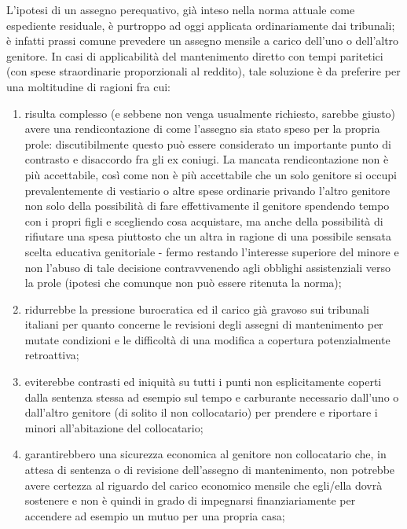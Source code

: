 \documentclass[twocolumn,12pt]{article}
\begin{document}
L'ipotesi di un assegno perequativo, già inteso nella norma attuale come espediente residuale, è purtroppo ad oggi applicata ordinariamente dai tribunali; è infatti prassi comune prevedere un assegno mensile a carico dell'uno o dell'altro genitore. In casi di applicabilità del mantenimento diretto con tempi paritetici (con spese straordinarie proporzionali al reddito), tale soluzione è da preferire per una moltitudine di ragioni fra cui:
\smallbreak
\begin{enumerate}[topsep=0pt,itemsep=-1ex,partopsep=1ex,parsep=1ex]
\item risulta complesso (e sebbene non venga usualmente richiesto, sarebbe giusto) avere una rendicontazione di come l'assegno sia stato speso per la propria prole: discutibilmente questo può essere considerato un importante punto di contrasto e disaccordo fra gli ex coniugi. La mancata rendicontazione non è più accettabile, così come non è più accettabile che un solo genitore si occupi prevalentemente di vestiario o altre spese ordinarie privando l'altro genitore non solo della possibilità di fare effettivamente il genitore spendendo tempo con i propri figli e scegliendo cosa acquistare, ma anche della possibilità di rifiutare una spesa piuttosto che un altra in ragione di una possibile sensata scelta educativa genitoriale - fermo restando l'interesse superiore del minore e non l'abuso di tale decisione contravvenendo agli obblighi assistenziali verso la prole (ipotesi che comunque non può essere ritenuta la norma);
\item ridurrebbe la pressione burocratica ed il carico già gravoso sui tribunali italiani per quanto concerne le revisioni degli assegni di mantenimento per mutate condizioni e le difficoltà di una modifica a copertura potenzialmente retroattiva;
\item eviterebbe contrasti ed iniquità su tutti i punti non esplicitamente coperti dalla sentenza stessa ad esempio sul tempo e carburante necessario dall'uno o dall'altro genitore (di solito il non collocatario) per prendere e riportare i minori all'abitazione del collocatario;
\item garantirebbero una sicurezza economica al genitore non collocatario che, in attesa di sentenza o di revisione dell'assegno di mantenimento, non potrebbe avere certezza al riguardo del carico economico mensile che egli/ella dovrà sostenere e non è quindi in grado di impegnarsi finanziariamente per accendere ad esempio un mutuo per una propria casa;
\end{enumerate}
\end{document}
